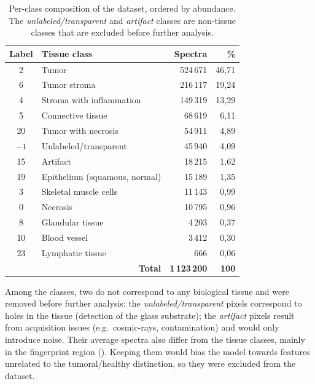 \begin{table}[ht]
    \centering
    \begin{tabular}{|c|l|r|r|}
        \hline
        \textbf{Label} & \textbf{Tissue class} & \textbf{Spectra} & \textbf{\%} \\
        \hline
        2  & Tumor                         & 524\,671 & 46,71 \\
        6  & Tumor stroma                  & 216\,117 & 19,24 \\
        4  & Stroma with inflammation      & 149\,319 & 13,29 \\
        5  & Connective tissue             & 68\,619  & 6,11  \\
        20 & Tumor with necrosis           & 54\,911  & 4,89  \\
        $-1$ & Unlabeled/transparent       & 45\,940  & 4,09  \\
        15 & Artifact                      & 18\,215  & 1,62  \\
        19 & Epithelium (squamous, normal) & 15\,189  & 1,35  \\
        3  & Skeletal muscle cells         & 11\,143  & 0,99  \\
        0  & Necrosis                      & 10\,795  & 0,96  \\
        8  & Glandular tissue              & 4\,203   & 0,37  \\
        10 & Blood vessel                  & 3\,412   & 0,30  \\
        23 & Lymphatic tissue              & 666      & 0,06  \\
        \hline
        \multicolumn{2}{|r|}{\textbf{Total}} & \textbf{1\,123\,200} & \textbf{100} \\
        \hline
    \end{tabular}
    \caption{Per-class composition of the dataset, ordered by abundance. The \textit{unlabeled/transparent} and \textit{artifact} classes are non-tissue classes that are excluded before further analysis.}
    \label{tab:label-distribution}
\end{table}

Among the classes, two do not correspond to any biological tissue and were removed before further analysis: the \textit{unlabeled/transparent} pixels correspond to holes in the tissue (detection of the glass substrate); the \textit{artifact} pixels result from acquisition issues (e.g.\ cosmic-rays, contamination) and would only introduce noise. Their average spectra also differ from the tissue classes, mainly in the fingerprint region (). Keeping them would bias the model towards features unrelated to the tumoral/healthy distinction, so they were excluded from the dataset.

